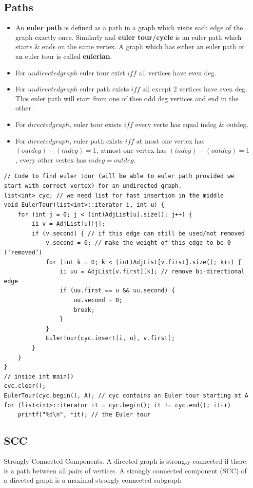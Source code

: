 \documentclass[8pt, a4paper, oneside, twocolumn]{extarticle}
\begin{document}
\subsection{Paths}
\begin{itemize}
    \item An \textbf{euler path} is defined as a path in a graph which visits each edge of the graph exactly once. Similarly and \textbf{euler tour/cycle }is an euler path which starts \& ends on the same vertex. A graph which has either an euler path or an euler tour is called \textbf{eulerian}.
    \item For $undirected graph$ euler tour exist $iff$ all vertices have even deg.
    \item For $undirected graph$ euler path exists $iff$ all except 2 vertices have even deg. This euler path will start from one of thee odd deg vertices and end in the other.
    \item For $directed graph$, euler tour exists $iff$ every verte has equal indeg \& outdeg.
    \item For $directed graph$, euler path exists $iff$ at most one vertex has $(outdeg) - (indeg) = 1$, atmost one vertex has $(indeg) - (outdeg) = 1$, every other vertex has $indeg = outdeg$.
\end{itemize}
\begin{verbatim}
// Code to find euler tour (will be able to euler path provided we start with correct vertex) for an undirected graph.
list<int> cyc; // we need list for fast insertion in the middle
void EulerTour(list<int>::iterator i, int u) {
    for (int j = 0; j < (int)AdjList[u].size(); j++) {
        ii v = AdjList[u][j];
        if (v.second) { // if this edge can still be used/not removed
            v.second = 0; // make the weight of this edge to be 0 (‘removed’)
            for (int k = 0; k < (int)AdjList[v.first].size(); k++) {
                ii uu = AdjList[v.first][k]; // remove bi-directional edge
                if (uu.first == u && uu.second) {
                    uu.second = 0;
                    break;
                } 
            }
            EulerTour(cyc.insert(i, u), v.first);
        } 
    }
}
// inside int main()
cyc.clear();
EulerTour(cyc.begin(), A); // cyc contains an Euler tour starting at A
for (list<int>::iterator it = cyc.begin(); it != cyc.end(); it++)
    printf("%d\n", *it); // the Euler tour
\end{verbatim}
\subsection{SCC}
Strongly Connected Components. A directed graph is strongly connected if there is a path between all pairs of vertices. A strongly connected component (SCC) of a directed graph is a maximal strongly connected subgraph
\end{document}
